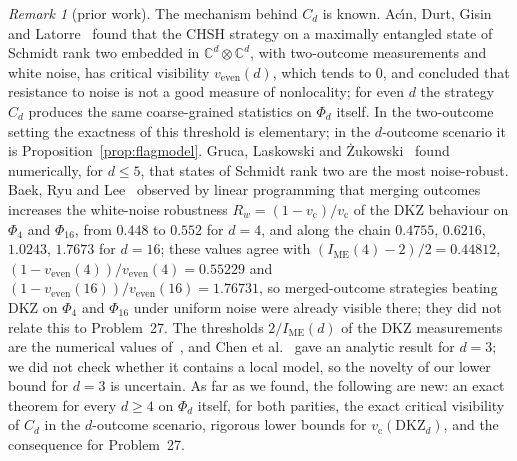 \documentclass[11pt]{amsart}
\theoremstyle{definition}
\theoremstyle{remark}
\newtheorem{remark}[theorem]{Remark}
\numberwithin{equation}{section}
\newcommand{\C}{\mathbb{C}}
\newcommand{\IME}{I_{\mathrm{ME}}}
\newcommand{\vc}{v_{\mathrm c}}
\newcommand{\veven}{v_{\mathrm{even}}}
\newcommand{\DKZ}{\mathrm{DKZ}}
\begin{document}
\begin{remark}[prior work]\label{rem:literalcredit}
The mechanism behind $C_d$ is known. Ac\'{\i}n, Durt, Gisin and Latorre~\cite[eq.~(14)]{ADGL} found that the CHSH
strategy on a maximally entangled state of Schmidt rank two embedded in $\C^d\otimes\C^d$, with two-outcome
measurements and white noise, has critical visibility $\veven(d)$, which tends to $0$, and concluded that resistance to
noise is not a good measure of nonlocality; for even $d$ the strategy $C_d$ produces the same coarse-grained statistics
on $\Phi_d$ itself. In the two-outcome setting the exactness of this threshold is elementary; in the $d$-outcome
scenario it is Proposition~\ref{prop:flagmodel}. Gruca, Laskowski and \.Zukowski~\cite{GLZ} found numerically, for
$d\le5$, that states of Schmidt rank two are the most noise-robust. Baek, Ryu and Lee~\cite{BRL} observed by linear
programming that merging outcomes increases the white-noise robustness $R_w=(1-\vc)/\vc$ of the DKZ behaviour on
$\Phi_4$ and $\Phi_{16}$, from $0.448$ to $0.552$ for $d=4$, and along the chain $0.4755$, $0.6216$, $1.0243$, $1.7673$
for $d=16$; these values agree with $(\IME(4)-2)/2=0.44812$, $(1-\veven(4))/\veven(4)=0.55229$ and
$(1-\veven(16))/\veven(16)=1.76731$, so merged-outcome strategies beating DKZ on $\Phi_4$ and $\Phi_{16}$ under uniform
noise were already visible there; they did not relate this to Problem~27. The thresholds $2/\IME(d)$ of the DKZ
measurements are the numerical values of~\cite{KGZMZ,DKZ,CGLMP,GLZ}, and Chen et al.~\cite{Chen01} gave an analytic
result for $d=3$; we did not check whether it contains a local model, so the novelty of our lower bound for $d=3$ is
uncertain. As far as we found, the following are new: an exact theorem for every $d\ge4$ on $\Phi_d$ itself, for both
parities, the exact critical visibility of $C_d$ in the $d$-outcome scenario, rigorous lower bounds for
$\vc(\DKZ_d)$, and the consequence for Problem~27.
\end{remark}
\end{document}
